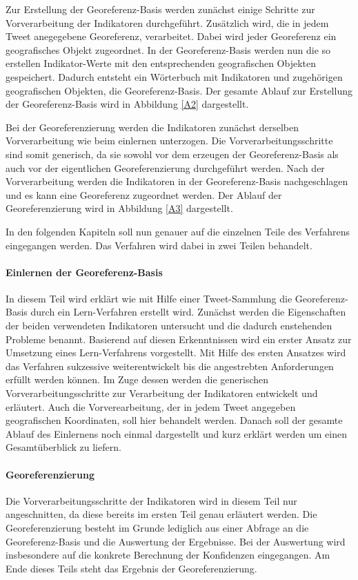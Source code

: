 	Zur Erstellung der Georeferenz-Basis werden zunächst einige Schritte zur Vorverarbeitung der Indikatoren durchgeführt.
	Zusätzlich wird, die in jedem Tweet anegegebene Georeferenz, verarbeitet.
	Dabei wird jeder Georeferenz ein geografisches Objekt zugeordnet.
	In der Georeferenz-Basis werden nun die so erstellen Indikator-Werte mit den entsprechenden geografischen Objekten gespeichert.
	Dadurch entsteht ein Wörterbuch mit Indikatoren und zugehörigen geografischen Objekten, die Georeferenz-Basis.
	Der gesamte Ablauf zur Erstellung der Georeferenz-Basis wird in Abbildung \ref{A2} dargestellt.

	Bei der Georeferenzierung werden die Indikatoren zunächst derselben Vorverarbeitung wie beim einlernen unterzogen.
	Die Vorverarbeitungsschritte sind somit generisch, da sie sowohl vor dem erzeugen der Georeferenz-Basis als auch vor der eigentlichen Georeferenzierung durchgeführt werden.
	Nach der Vorverarbeitung werden die Indikatoren in der Georeferenz-Basis nachgeschlagen und es kann eine Georeferenz zugeordnet werden.
	Der Ablauf der Georeferenzierung wird in Abbildung \ref{A3} dargestellt. 


	In den folgenden Kapiteln soll nun genauer auf die einzelnen Teile des Verfahrens eingegangen werden. 
	Das Verfahren wird dabei in zwei Teilen behandelt.

	\paragraph{Einlernen der Georeferenz-Basis}  
	In diesem Teil wird erklärt wie mit Hilfe einer Tweet-Sammlung die Georeferenz-Basis durch ein Lern-Verfahren erstellt wird.
	Zunächst werden die Eigenschaften der beiden verwendeten Indikatoren untersucht und die dadurch enstehenden Probleme benannt.
	Basierend auf diesen Erkenntnissen wird ein erster Ansatz zur Umsetzung eines Lern-Verfahrens vorgestellt.
	Mit Hilfe des ersten Ansatzes wird das Verfahren sukzessive weiterentwickelt bis die angestrebten Anforderungen erfüllt werden können.  
	Im Zuge dessen werden die generischen Vorverarbeitungsschritte zur Verarbeitung der Indikatoren entwickelt und erläutert.
	Auch die Vorverearbeitung, der in jedem Tweet angegeben geografischen Koordinaten, soll hier behandelt werden.
	Danach soll der gesamte Ablauf des Einlernens noch einmal dargestellt und kurz erklärt werden um einen Gesamtüberblick zu liefern.
	
	\paragraph{Georeferenzierung} 
	Die Vorverarbeitungsschritte der Indikatoren wird in diesem Teil nur angeschnitten, da diese bereits im ersten Teil genau erläutert werden. 
	Die Georeferenzierung besteht im Grunde lediglich aus einer Abfrage an die Georeferenz-Basis und die Auswertung der Ergebnisse.
	Bei der Auswertung wird insbesondere auf die konkrete Berechnung der Konfidenzen eingegangen.
	Am Ende dieses Teils steht das Ergebnis der Georeferenzierung. 


